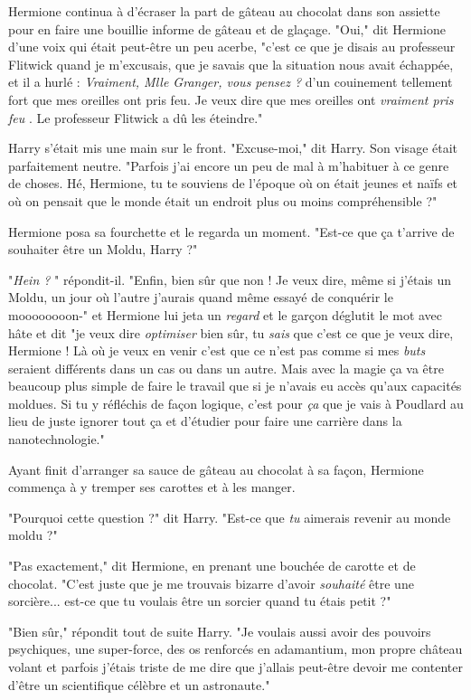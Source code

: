 Hermione continua à d'écraser la part de gâteau au chocolat dans son assiette pour en faire une bouillie informe de gâteau et de glaçage. "Oui," dit Hermione d'une voix qui était peut-être un peu acerbe, "c'est ce que je disais au professeur Flitwick quand je m'excusais, que je savais que la situation nous avait échappée, et il a hurlé : \emph{Vraiment, Mlle Granger, vous pensez ?}  d'un couinement tellement fort que mes oreilles ont pris feu. Je veux dire que mes oreilles ont \emph{vraiment pris feu} . Le professeur Flitwick a dû les éteindre."

Harry s'était mis une main sur le front. "Excuse-moi," dit Harry. Son visage était parfaitement neutre. "Parfois j'ai encore un peu de mal à m'habituer à ce genre de choses. Hé, Hermione, tu te souviens de l'époque où on était jeunes et naïfs et où on pensait que le monde était un endroit plus ou moins compréhensible ?"

Hermione posa sa fourchette et le regarda un moment. "Est-ce que ça t'arrive de souhaiter être un Moldu, Harry ?"

"\emph{Hein ?} " répondit-il. "Enfin, bien sûr que non ! Je veux dire, même si j'étais un Moldu, un jour où l'autre j'aurais quand même essayé de conquérir le moooooooon-" et Hermione lui jeta un \emph{regard}  et le garçon déglutit le mot avec hâte et dit "je veux dire \emph{optimiser}  bien sûr, tu \emph{sais}  que c'est ce que je veux dire, Hermione ! Là où je veux en venir c'est que ce n'est pas comme si mes \emph{buts } seraient différents dans un cas ou dans un autre. Mais avec la magie ça va être beaucoup plus simple de faire le travail que si je n'avais eu accès qu'aux capacités moldues. Si tu y réfléchis de façon logique, c'est pour \emph{ça}  que je vais à Poudlard au lieu de juste ignorer tout ça et d'étudier pour faire une carrière dans la nanotechnologie."

Ayant finit d'arranger sa sauce de gâteau au chocolat à sa façon, Hermione commença à y tremper ses carottes et à les manger.

"Pourquoi cette question ?" dit Harry. "Est-ce que \emph{tu } aimerais revenir au monde moldu ?"

"Pas exactement," dit Hermione, en prenant une bouchée de carotte et de chocolat. "C'est juste que je me trouvais bizarre d'avoir \emph{souhaité}  être une sorcière... est-ce que tu voulais être un sorcier quand tu étais petit ?"

"Bien sûr," répondit tout de suite Harry. "Je voulais aussi avoir des pouvoirs psychiques, une super-force, des os renforcés en adamantium, mon propre château volant et parfois j'étais triste de me dire que j'allais peut-être devoir me contenter d'être un scientifique célèbre et un astronaute."


